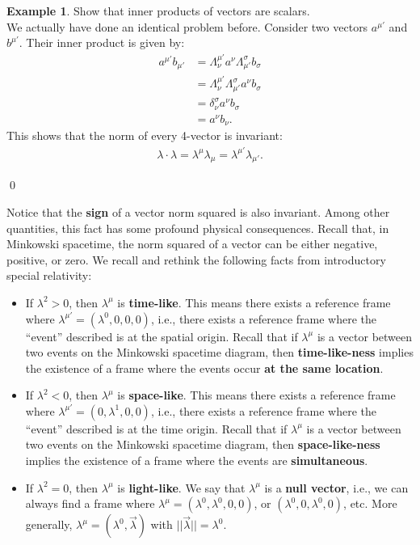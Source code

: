 \documentclass{book}
\theoremstyle{definition}
\newtheorem{exmp}{Example}[section]
\begin{document}
\begin{exmp}
	Show that inner products of vectors are scalars.\\
	
	We actually have done an identical problem before. Consider two vectors $a^{\mu'}$ and $b^{\mu'}$. Their inner product is given by:
	\begin{align*}
	a^{\mu'}b_{\mu'} &= \Lambda^{\mu'}_{\nu}a^{\nu}\Lambda^{\sigma}_{\mu'}b_\sigma\\
	&= \Lambda^{\mu'}_{\nu}\Lambda^{\sigma}_{\mu'}a^{\nu}b_\sigma\\
	&= \delta^\sigma_\nu a^\nu b_\sigma\\
	&= a^\nu b_\nu.
	\end{align*}
	This shows that the norm of every 4-vector is invariant:
	\begin{align*}
	\lambda\cdot\lambda = \lambda^\mu \lambda_\mu = \lambda^{\mu'}\lambda_{\mu'}.
	\end{align*}
\end{exmp}\qed

Notice that the \textbf{sign} of a vector norm squared is also invariant. Among other quantities, this fact has some profound physical consequences. Recall that, in Minkowski spacetime, the norm squared of a vector can be either negative, positive, or zero. We recall and rethink the following facts from introductory special relativity:
\begin{itemize}
	\item If $\lambda^2 > 0$, then $\lambda^\mu$ is \textbf{time-like}. This means there exists a reference frame where $\lambda^{\mu'} = (\lambda^0,0,0,0)$, i.e., there exists a reference frame where the ``event'' described is at the spatial origin. Recall that if $\lambda^\mu$ is a vector between two events on the Minkowski spacetime diagram, then \textbf{time-like-ness} implies the existence of a frame where the events occur \textbf{at the same location}.
	\item If $\lambda^2 < 0$, then $\lambda^\mu$ is \textbf{space-like}. This means there exists a reference frame where $\lambda^{\mu'} = (0, \lambda^1,0,0)$, i.e., there exists a reference frame where the ``event'' described is at the time origin. Recall that if $\lambda^\mu$ is a vector between two events on the Minkowski spacetime diagram, then \textbf{space-like-ness} implies the existence of a frame where the events are \textbf{simultaneous}.
	\item If $\lambda^2 = 0$, then $\lambda^\mu$ is \textbf{light-like}. We say that $\lambda^\mu$ is a \textbf{null vector}, i.e., we can always find a frame where $\lambda^\mu = (\lambda^0, \lambda^0,0,0)$, or $(\lambda^0, 0, \lambda^0, 0)$, etc. More generally, $\lambda^\mu = (\lambda^0, \vec{\lambda})$ with $\vert\vert\vec{\lambda}\vert\vert = \lambda^0$.\\
\end{itemize}
\end{document}

